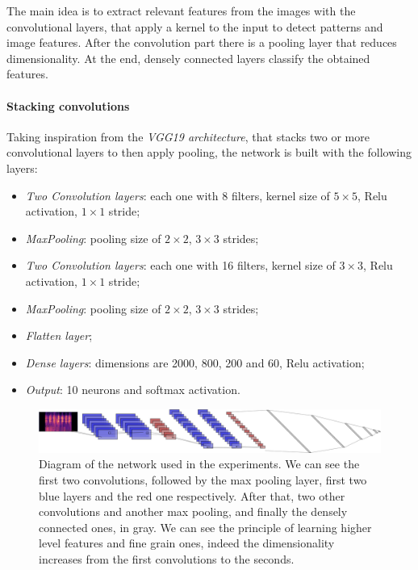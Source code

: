 The main idea is to extract relevant features from the images 
with the convolutional layers, that apply a kernel to the input 
to detect patterns and image features.
After the convolution part there is a pooling layer that reduces dimensionality.
At the end, densely connected layers classify the obtained features.

\paragraph{Stacking convolutions}
Taking inspiration from the \emph{VGG19 architecture}, that stacks two or more 
convolutional layers to then apply pooling, the network is built with 
the following layers:~\cite{vgg}
\begin{itemize}
    \item \emph{Two Convolution layers}: each one with 8 filters, kernel size of $5 \times 5$, Relu activation, $1 \times 1$ stride;
    \item \emph{MaxPooling}: pooling size of $2 \times 2$, $3 \times 3$ strides;
    \item \emph{Two Convolution layers}: each one with 16 filters, kernel size of $3 \times 3$, Relu activation, $1 \times 1$ stride;
    \item \emph{MaxPooling}: pooling size of $2 \times 2$, $3 \times 3$ strides;
    \item \emph{Flatten layer};
    \item \emph{Dense layers}: dimensions are 2000, 800, 200 and 60, Relu activation;
    \item \emph{Output}: 10 neurons and softmax activation.
\end{itemize}

\begin{figure}[h]
    \includegraphics[width=\textwidth]{images/cnn.png}  
    \caption{Diagram of the network used in the experiments. We can see 
    the first two convolutions, followed by the max pooling layer, first two blue layers and 
    the red one respectively. After that, two other convolutions and 
    another max pooling, and finally the densely connected ones, in gray. We can see the principle of 
    learning higher level features and fine grain ones, indeed the dimensionality increases 
    from the first convolutions to the seconds.}  
    \label{cnn}
\end{figure}

